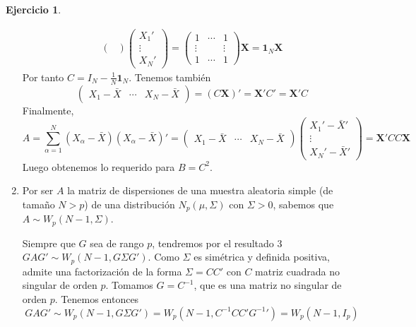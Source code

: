 \documentclass[12pt,spanish]{article}
\theoremstyle{definition}
\newtheorem{exercise}{Ejercicio}
\begin{document}
\begin{exercise}
\begin{enumerate}[$a)$]
\begin{align*}
\begin{pmatrix}
    \end{pmatrix}
    \begin{pmatrix}
      X_1' \\ \vdots \\ X_N'
    \end{pmatrix}=
    \begin{pmatrix}
      1 & \cdots & 1 \\ \vdots & & \vdots \\ 1 & \cdots & 1
    \end{pmatrix}
    \textbf{X}=\textbf{1}_N\textbf{X}
  \end{align*}
  Por tanto $C=I_N-\frac{1}{N}\textbf{1}_N$.
Tenemos también
\[
  \begin{pmatrix}
    X_1-\bar{X} & \cdots & X_N-\bar{X}
  \end{pmatrix}=(C\textbf{X})'=\textbf{X}'C'=\textbf{X}'C
\]
Finalmente,
\[A=\sum_{\alpha=1}^N(X_\alpha-\bar{X})(X_\alpha-\bar{X})'=\begin{pmatrix}
    X_1-\bar{X} & \cdots & X_N-\bar{X}
  \end{pmatrix}\begin{pmatrix}
      X_1'-\bar{X}' \\ \vdots \\ X_N'-\bar{X}'
    \end{pmatrix}=\textbf{X}'CC\textbf{X}\]
  Luego obtenemos lo requerido para $B=C^2$.

\item Por ser $A$ la matriz de dispersiones de una muestra aleatoria
  simple (de tamaño $N>p$) de una distribución $N_p(\mu,\Sigma)$ con
  $\Sigma>0$, sabemos que $A\sim W_p(N-1,\Sigma)$.

  Siempre que $G$ sea de rango $p$, tendremos por el resultado 3
  $GAG'\sim W_p(N-1, G\Sigma G')$. Como $\Sigma$ es simétrica y
  definida positiva, admite una factorización de la forma $\Sigma=CC'$
  con $C$ matriz cuadrada no singular de orden $p$. Tomamos
  $G=C^{-1}$, que es una matriz no singular de orden $p$. Tenemos entonces
  \[GAG'\sim W_p(N-1, G\Sigma G')=W_p(N-1, C^{-1}C C' {G^{-1}}')=W_p(N-1, I_p)\]
\end{enumerate}
\end{exercise}
\end{document}
